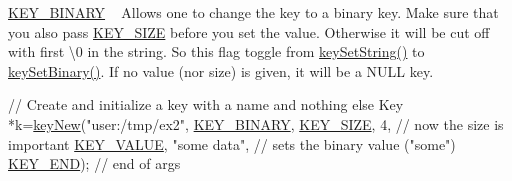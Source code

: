 \begin{DoxyItemize}
\item \hyperlink{group__key_gga9b703ca49f48b482def322b77d3e6bc8a1ca18d4e094ae7487d35ecedda2235ff}{K\+E\+Y\+\_\+\+B\+I\+N\+A\+RY} ~\newline
 Allows one to change the key to a binary key. Make sure that you also pass \hyperlink{group__key_gga9b703ca49f48b482def322b77d3e6bc8a6d531b5c41445d19d0452eebdccbfa01}{K\+E\+Y\+\_\+\+S\+I\+ZE} before you set the value. Otherwise it will be cut off with first \textbackslash{}0 in the string. So this flag toggle from \hyperlink{group__keyvalue_ga622bde1eb0e0c4994728331326340ef2}{key\+Set\+String()} to \hyperlink{group__keyvalue_gaa50a5358fd328d373a45f395fa1b99e7}{key\+Set\+Binary()}. If no value (nor size) is given, it will be a N\+U\+LL key. 
\begin{DoxyCodeInclude}
\textcolor{comment}{// Create and initialize a key with a name and nothing else}
Key *k=\hyperlink{group__key_gad23c65b44bf48d773759e1f9a4d43b89}{keyNew}(\textcolor{stringliteral}{"user:/tmp/ex2"},
        \hyperlink{group__key_gga9b703ca49f48b482def322b77d3e6bc8a1ca18d4e094ae7487d35ecedda2235ff}{KEY\_BINARY},
        \hyperlink{group__key_gga9b703ca49f48b482def322b77d3e6bc8a6d531b5c41445d19d0452eebdccbfa01}{KEY\_SIZE}, 4,               \textcolor{comment}{// now the size is important}
        \hyperlink{group__key_gga9b703ca49f48b482def322b77d3e6bc8ac66e4a49d09212b79f5754ca6db5bd2e}{KEY\_VALUE}, \textcolor{stringliteral}{"some data"},    \textcolor{comment}{// sets the binary value ("some")}
        \hyperlink{group__key_gga9b703ca49f48b482def322b77d3e6bc8aa8adb6fcb92dec58fb19410eacfdd403}{KEY\_END});                  \textcolor{comment}{// end of args}
\end{DoxyCodeInclude}

\end{DoxyItemize}

